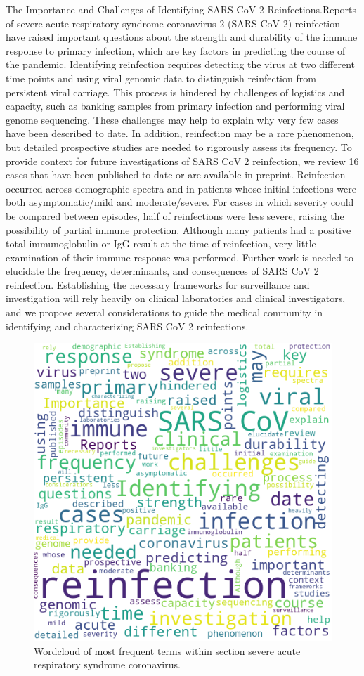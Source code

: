 \documentclass{qqtarticle}
\begin{document}
            The Importance and Challenges of Identifying SARS CoV 2 Reinfections.Reports of severe acute respiratory syndrome coronavirus 2 (SARS CoV 2) reinfection have raised important questions about the strength and durability of the immune response to primary infection, which are key factors in predicting the course of the pandemic. Identifying reinfection requires detecting the virus at two different time points and using viral genomic data to distinguish reinfection from persistent viral carriage. This process is hindered by challenges of logistics and capacity, such as banking samples from primary infection and performing viral genome sequencing. These challenges may help to explain why very few cases have been described to date. In addition, reinfection may be a rare phenomenon, but detailed prospective studies are needed to rigorously assess its frequency. To provide context for future investigations of SARS CoV 2 reinfection, we review 16 cases that have been published to date or are available in preprint. Reinfection occurred across demographic spectra and in patients whose initial infections were both asymptomatic/mild and moderate/severe. For cases in which severity could be compared between episodes, half of reinfections were less severe, raising the possibility of partial immune protection. Although many patients had a positive total immunoglobulin or IgG result at the time of reinfection, very little examination of their immune response was performed. Further work is needed to elucidate the frequency, determinants, and consequences of SARS CoV 2 reinfection. Establishing the necessary frameworks for surveillance and investigation will rely heavily on clinical laboratories and clinical investigators, and we propose several considerations to guide the medical community in identifying and characterizing SARS CoV 2 reinfections.

        \begin{figure}[H]
            \centering
            \includegraphics[width=.75\linewidth]{img/severeacuterespiratorysyndromecoronavirus.png}
            \caption{Wordcloud of most frequent terms within section severe acute respiratory syndrome coronavirus.}
            \label{fig:wcl_severeacuterespiratorysyndromecoronavirus}
        \end{figure}
\end{document}
